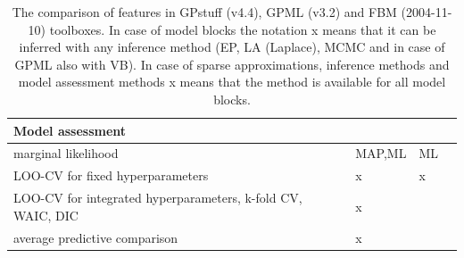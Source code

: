 \documentclass[twoside,11pt]{article}
\begin{document}
\begin{table}
\begin{tabular}{p{9.5cm}p{2.3cm}p{2.1cm}p{0.9cm}}
    \multicolumn{4}{l}{\textbf{Model assessment}} \\
    \hline
    marginal likelihood & MAP,ML & ML & \\
    LOO-CV for fixed hyperparameters & x & x & \\
    LOO-CV for integrated hyperparameters, k-fold CV, WAIC, DIC & x &  &  \\
    average predictive comparison & x &  & 
  \end{tabular}
  \normalsize
  \caption{The comparison of features in GPstuff (v4.4), GPML (v3.2) and FBM (2004-11-10)
    toolboxes. In case of model blocks the notation x means that it
    can be inferred with any inference method (EP, LA (Laplace), MCMC and
    in case of GPML also with VB). In case of sparse approximations,
    inference methods and model assessment methods x means
    that the method is available for all model blocks.\label{table:comparison}}
\end{table}
\end{document}
